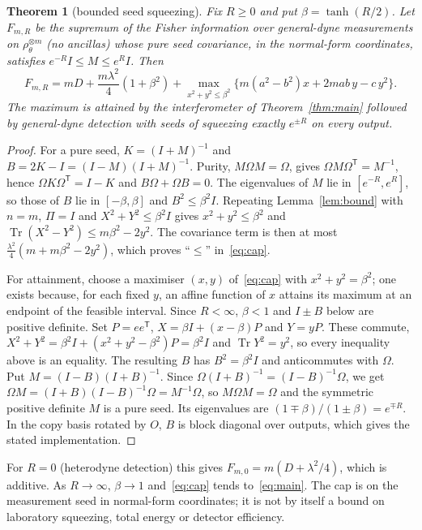 \documentclass[11pt,a4paper]{article}
\newtheorem{theorem}{Theorem}
\theoremstyle{definition}\newtheorem{definition}{Definition}
\theoremstyle{remark}\newtheorem{remark}{Remark}
\newcommand{\tr}{\operatorname{Tr}}
\begin{document}
\begin{theorem}[bounded seed squeezing]\label{thm:cap}
Fix $R\ge0$ and put $\beta=\tanh(R/2)$. Let $F_{m,R}$ be the supremum of the Fisher information over general-dyne measurements on $\rho_\theta^{\otimes m}$ (no ancillas) whose pure seed covariance, in the normal-form coordinates, satisfies $e^{-R}I\le M\le e^{R}I$. Then
\begin{equation}\label{eq:cap}
F_{m,R}=mD+\frac{m\lambda^2}{4}(1+\beta^2)+\max_{x^2+y^2\le\beta^2}\big\{m(a^2-b^2)x+2mab\,y-c\,y^2\big\}.
\end{equation}
The maximum is attained by the interferometer of Theorem~\ref{thm:main} followed by general-dyne detection with seeds of squeezing exactly $e^{\pm R}$ on every output.
\end{theorem}

\begin{proof}
For a pure seed, $K=(I+M)^{-1}$ and $B=2K-I=(I-M)(I+M)^{-1}$. Purity, $M\Omega M=\Omega$, gives $\Omega M\Omega^{\mathsf T}=M^{-1}$, hence $\Omega K\Omega^{\mathsf T}=I-K$ and $B\Omega+\Omega B=0$. The eigenvalues of $M$ lie in $[e^{-R},e^{R}]$, so those of $B$ lie in $[-\beta,\beta]$ and $B^2\le\beta^2I$. Repeating Lemma~\ref{lem:bound} with $n=m$, $\Pi=I$ and $X^2+Y^2\le\beta^2I$ gives $x^2+y^2\le\beta^2$ and $\tr(X^2-Y^2)\le m\beta^2-2y^2$. The covariance term is then at most $\tfrac{\lambda^2}{4}(m+m\beta^2-2y^2)$, which proves ``$\le$'' in~\eqref{eq:cap}.

For attainment, choose a maximiser $(x,y)$ of~\eqref{eq:cap} with $x^2+y^2=\beta^2$; one exists because, for each fixed $y$, an affine function of $x$ attains its maximum at an endpoint of the feasible interval. Since $R<\infty$, $\beta<1$ and $I\pm B$ below are positive definite. Set $P=ee^{\mathsf T}$, $X=\beta I+(x-\beta)P$ and $Y=yP$. These commute, $X^2+Y^2=\beta^2I+(x^2+y^2-\beta^2)P=\beta^2I$ and $\tr Y^2=y^2$, so every inequality above is an equality. The resulting $B$ has $B^2=\beta^2I$ and anticommutes with $\Omega$. Put $M=(I-B)(I+B)^{-1}$. Since $\Omega(I+B)^{-1}=(I-B)^{-1}\Omega$, we get $\Omega M=(I+B)(I-B)^{-1}\Omega=M^{-1}\Omega$, so $M\Omega M=\Omega$ and the symmetric positive definite $M$ is a pure seed. Its eigenvalues are $(1\mp\beta)/(1\pm\beta)=e^{\mp R}$. In the copy basis rotated by $O$, $B$ is block diagonal over outputs, which gives the stated implementation.
\end{proof}

For $R=0$ (heterodyne detection) this gives $F_{m,0}=m(D+\lambda^2/4)$, which is additive. As $R\to\infty$, $\beta\to1$ and~\eqref{eq:cap} tends to~\eqref{eq:main}. The cap is on the measurement seed in normal-form coordinates; it is not by itself a bound on laboratory squeezing, total energy or detector efficiency.
\end{document}
